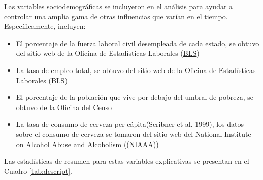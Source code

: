 \documentclass[11pt,]{article}
\providecommand{\tightlist}{%
\setlength{\itemsep}{0pt}\setlength{\parskip}{0pt}}
\begin{document}
Las variables sociodemográficas se incluyeron en el análisis para ayudar
a controlar una amplia gama de otras influencias que varían en el
tiempo. Específicamente, incluyen:

\begin{itemize}
\tightlist
\item
  El porcentaje de la fuerza laboral civil desempleada de cada estado,
  se obtuvo del sitio web de la Oficina de Estadísticas Laborales
  (\href{https://www.bls.gov/lau/}{BLS})
\item
  La tasa de empleo total, se obtuvo del sitio web de la Oficina de
  Estadísticas Laborales (\href{https://www.bls.gov/sae/}{BLS})
\item
  El porcentaje de la población que vive por debajo del umbral de
  pobreza, se obtuvo de la
  \href{https://www.census.gov/topics/income-poverty/poverty.html}{Oficina
  del Censo}
\item
  La tasa de consumo de cerveza per cápita(Scribner et al. 1999), los
  datos sobre el consumo de cerveza se tomaron del sitio web del
  National Institute on Alcohol Abuse and Alcoholism
  (\href{https://pubs.niaaa.nih.gov/publications/surveillance110/CONS16.htm}{(NIAAA)})
\end{itemize}

Las estadísticas de resumen para estas variables explicativas se
presentan en el Cuadro \ref{tab:descript}.
\end{document}
